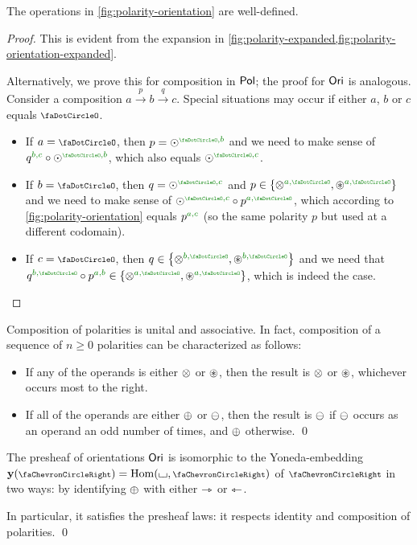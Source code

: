 \documentclass[a4paper]{memoir}
\begin{document}
\begin{proposition}
	The operations in \cref{fig:polarity-orientation} are well-defined.
\end{proposition}
\begin{proof}
	This is evident from the expansion in \cref{fig:polarity-expanded,fig:polarity-orientation-expanded}.
	
	Alternatively, we prove this for composition in ${\mathsf{Pol}}$; the proof for ${\mathsf{Ori}}$ is analogous.
	Consider a composition $a \xrightarrow{p} b \xrightarrow{q} c$.
	Special situations may occur if either $a$, $b$ or $c$ equals $\npolar$.
	\begin{itemize}
		\item If $a = \npolar$, then $p = \nonpol \pmrhom \npolar b$ and we need to make sense of $q \pmrhom b c \circ \nonpol \pmrhom \npolar b$, which also equals $\nonpol \pmrhom \npolar c$.
		\item If $b = \npolar$, then $q = \nonpol \pmrhom \npolar c$ and $p \in \accol{\mixpol \pmrhom a \npolar, \isopol \pmrhom a \npolar}$ and we need to make sense of $\nonpol \pmrhom \npolar c \circ p \pmrhom a \npolar$, which according to \cref{fig:polarity-orientation} equals $p \pmrhom a c$ (so the same polarity $p$ but used at a different codomain).
		\item If $c = \npolar$, then $q \in \accol{\mixpol \pmrhom b \npolar, \isopol \pmrhom b \npolar}$ and we need that $q \pmrhom b \npolar \circ p \pmrhom a b \in \accol{\mixpol \pmrhom a \npolar, \isopol \pmrhom a \npolar}$, which is indeed the case. \qedhere
	\end{itemize}
\end{proof}
\begin{proposition}
	Composition of polarities is unital and associative.
	In fact, composition of a sequence of $n \geq 0$ polarities can be characterized as follows:
	\begin{itemize}
		\item If any of the operands is either ${\otimes}$ or ${\oast}$, then the result is ${\otimes}$ or ${\oast}$, whichever occurs most to the right.
		\item If all of the operands are either ${\oplus}$ or ${\ominus}$, then the result is ${\ominus}$ if ${\ominus}$ occurs as an operand an odd number of times, and ${\oplus}$ otherwise. \qed
	\end{itemize}
\end{proposition}
\begin{proposition} \label{thm:oripsh-yoneda}
	The presheaf of orientations ${\mathsf{Ori}}$ is isomorphic to the Yoneda-embedding $\yoneda(\ypolar) = \Hom(\loch, \ypolar)$ of $\ypolar$ in two ways: by identifying ${\oplus}$ with either ${\rightarrowtriangle}$ or ${\leftarrowtriangle}$. 
	
	In particular, it satisfies the presheaf laws: it respects identity and composition of polarities. \qed
\end{proposition}
\end{document}
